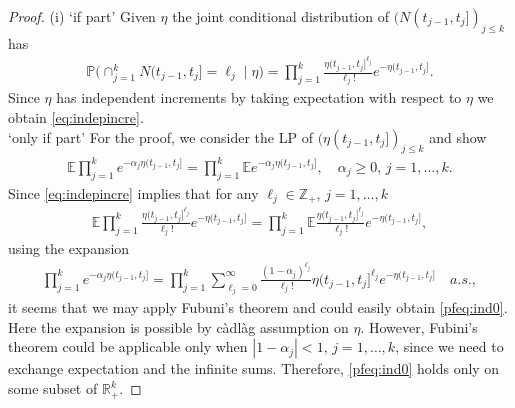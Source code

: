 \documentclass[11pt,leqno%
]{amsart}
\newcommand{\R}{\mathbb{R}}
\newcommand{\E }{{\mathbb E}}
\newcommand{\Z }{{\mathbb Z}}
\renewcommand{\P }{{\mathbb P}}
\newcommand{\1}{{\mathbf 1}}
\begin{document}
\begin{proof}
 (i) `if part' Given $\eta$ the joint conditional distribution of
 $(N(t_{j-1},t_j])_{j\le k}$ has 
\begin{align} \label{pf:11}
 \P\big(
 \cap_{j=1}^k N(t_{j-1},t_j]=\ell_j \mid \eta
 \big) = \prod_{j=1}^k \frac{\eta(t_{j-1},t_j]^{\ell_j}}{\ell_j!}
 e^{-\eta(t_{j-1},t_j]}. 
\end{align}
 Since $\eta$ has independent increments by taking expectation with
 respect to $\eta$ we obtain \eqref{eq:indepincre}. \\
`only if part' For the proof, we consider the LP of %
 $(\eta(t_{j-1},t_j])_{j\le k}$ and show %
\begin{align}
\label{pfeq:ind0}
 \E \prod_{j=1}^k e^{-\alpha_j \eta(t_{j-1},t_j]}  = \prod_{j=1}^k \E
 e^{-\alpha_j \eta(t_{j-1},t_j]},\quad \alpha_j\ge0,\,j=1,\ldots,k. 
\end{align}
Since \eqref{eq:indepincre} implies that for any $\ell_j \in
 \Z_+,\,j=1,\ldots,k$ 
 \begin{align}
 \label{pfeq:ind1}
  \E \prod_{j=1}^k \frac{\eta(t_{j-1},t_j]^{\ell_j}}{\ell_j!}
 e^{-\eta(t_{j-1},t_j]}= \prod_{j=1}^k \E
 \frac{\eta(t_{j-1},t_j]^{\ell_j}}{\ell_j!} e^{-\eta(t_{j-1},t_j]},   
 \end{align}
 using the expansion 
\begin{align*}
 \prod_{j=1}^k e^{-\alpha_j\eta(t_{j-1},t_j]} = \prod_{j=1}^k \sum_{\ell_j =0}^\infty
 \frac{(1-\alpha_j)^{\ell_j} }{\ell_j !} \eta(t_{j-1},t_j]^{\ell_j}
 e^{-\eta(t_{j-1},t_j]}\quad a.s., %
\end{align*} 
it seems that we may apply Fubuni's theorem and could easily obtain
 \eqref{pfeq:ind0}. Here the expansion is possible by c\`adl\`ag assumption on $\eta$. 
 However, Fubini's theorem could be applicable only when
 $|1-\alpha_j|<1,\,j=1,\ldots,k$, since we need to exchange expectation and the
 infinite sums. Therefore, \eqref{pfeq:ind0} holds only on some subset of
 $\R_+^k$. 


\end{proof}
\end{document}
